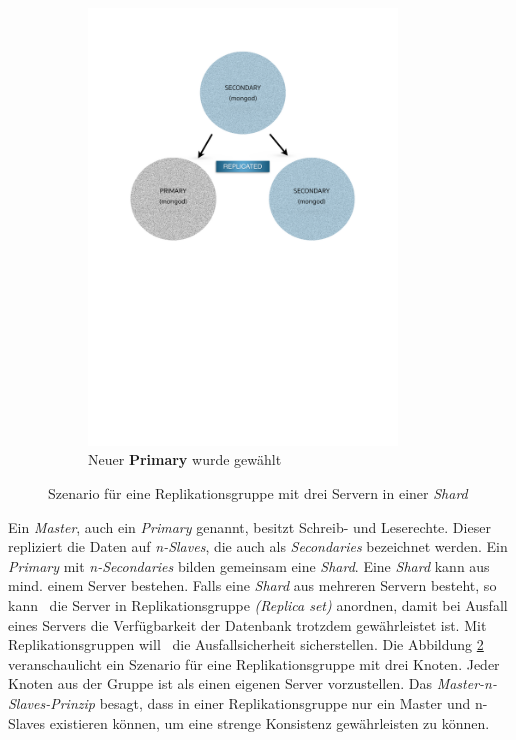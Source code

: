 \begin{figure}[H]
\begin{subfigure}[t]{0.49\textwidth}
        \includegraphics[trim = 28mm 139mm 28mm 29mm, clip, width=0.9\textwidth]{resources/replicaSet/newReplicaSet}
      \caption[Neuer \textbf{Primary} wurde gewählt]{Neuer \textbf{Primary} wurde gewählt}
      \label{img:newReplicaSet}
   \end{subfigure}
   \caption{Szenario für eine Replikationsgruppe mit drei Servern in einer \textit{Shard}}
   \label{img:replicaSetSzenario}
\end{figure}
Ein \textit{Master}, auch ein \textit{Primary} genannt, besitzt Schreib- und Leserechte. Dieser repliziert die Daten auf \textit{n-Slaves}, die auch als \textit{Secondaries} bezeichnet werden. Ein \textit{Primary} mit \textit{n-Secondaries} bilden gemeinsam eine \textit{Shard}. Eine \textit{Shard} kann aus mind. einem Server bestehen. Falls eine \textit{Shard} aus mehreren Servern besteht, so kann \mongo\ die Server in Replikationsgruppe \textit{(Replica set)} anordnen, damit bei Ausfall eines Servers die Verfügbarkeit der Datenbank trotzdem gewährleistet ist. Mit Replikationsgruppen will \mongo\ die Ausfallsicherheit sicherstellen. Die Abbildung \ref{img:replicaSetSzenario} veranschaulicht ein Szenario für eine Replikationsgruppe mit drei Knoten. Jeder Knoten aus der Gruppe ist als einen eigenen Server vorzustellen. Das \textit{Master-n-Slaves-Prinzip} besagt, dass in einer Replikationsgruppe nur ein Master und n-Slaves existieren können, um eine strenge Konsistenz gewährleisten zu können. 
